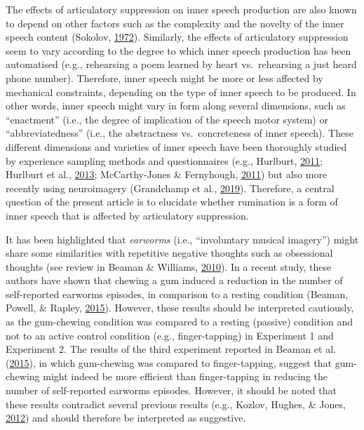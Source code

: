 \documentclass[a4paper,12pt,twoside,onecolumn,openright,final,oldfontcommands]{memoir}
\begin{document}
The effects of articulatory suppression on inner speech production are also known to depend on other factors such as the complexity and the novelty of the inner speech content (Sokolov, \protect\hyperlink{ref-sokolov_inner_1972}{1972}). Similarly, the effects of articulatory suppression seem to vary according to the degree to which inner speech production has been automatised (e.g., rehearsing a poem learned by heart vs.~rehearsing a just heard phone number). Therefore, inner speech might be more or less affected by mechanical constraints, depending on the type of inner speech to be produced. In other words, inner speech might vary in form along several dimensions, such as \enquote{enactment} (i.e., the degree of implication of the speech motor system) or \enquote{abbreviatedness} (i.e., the abstractness vs.~concreteness of inner speech). These different dimensions and varieties of inner speech have been thoroughly studied by experience sampling methods and questionnaires (e.g., Hurlburt, \protect\hyperlink{ref-Hurlburt2011}{2011}; Hurlburt et al., \protect\hyperlink{ref-Hurlburt2013}{2013}; McCarthy-Jones \& Fernyhough, \protect\hyperlink{ref-McCarthy-Jones2011}{2011}) but also more recently using neuroimagery (Grandchamp et al., \protect\hyperlink{ref-grandchamp_condensation_2019}{2019}). Therefore, a central question of the present article is to elucidate whether rumination is a form of inner speech that is affected by articulatory suppression.

It has been highlighted that \emph{earworms} (i.e., \enquote{involuntary musical imagery}) might share some similarities with repetitive negative thoughts such as obsessional thoughts (see review in Beaman \& Williams, \protect\hyperlink{ref-Beaman2010}{2010}). In a recent study, these authors have shown that chewing a gum induced a reduction in the number of self-reported earworms episodes, in comparison to a resting condition (Beaman, Powell, \& Rapley, \protect\hyperlink{ref-Beaman2015}{2015}). However, these results should be interpreted cautiously, as the gum-chewing condition was compared to a resting (passive) condition and not to an active control condition (e.g., finger-tapping) in Experiment 1 and Experiment 2. The results of the third experiment reported in Beaman et al. (\protect\hyperlink{ref-Beaman2015}{2015}), in which gum-chewing was compared to finger-tapping, suggest that gum-chewing might indeed be more efficient than finger-tapping in reducing the number of self-reported earworms episodes. However, it should be noted that these results contradict several previous results (e.g., Kozlov, Hughes, \& Jones, \protect\hyperlink{ref-kozlov_gummed-up_2012}{2012}) and should therefore be interpreted as suggestive.
\end{document}

